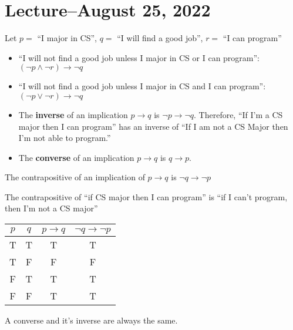 \documentclass{scrreprt}
\begin{document}
\section{Lecture--August 25, 2022}

Let $p=$ ``I major in CS'', $q=$ ``I will find a good job'', $r=$ ``I can program''

\begin{itemize}

	\item ``I will not find a good job unless I major in CS or I can program'': $(\neg p \land \neg r)\rightarrow \neg q$

	\item ``I will not find a good job unless I major in CS and I can program'': $(\neg p \lor \neg r)\rightarrow \neg q$

	\item The \textbf{inverse} of an implication $p\rightarrow q$ is $\neg p\rightarrow \neg q$.
	      Therefore, ``If I'm a CS major then I can program'' has an inverse of
	      ``If I am not a CS Major then I'm not able to program.''

	\item The \textbf{converse} of an implication $p\rightarrow q$ is $q\rightarrow p$.

\end{itemize}

\begin{definition}[Contrapositive]
	The contrapositive of an implication of $p\rightarrow q$ is $\neg q\rightarrow \neg p$

	The contrapositive of ``if CS major then I can program'' is ``if I can't program, then I'm not a CS major''

	\begin{tabular}{|c|c|c|c|}
		\hline
		$p$ & $q$ & $p\rightarrow q$ & $\neg q\rightarrow \neg p$ \\
		\hline
		T   & T   & T                & T                          \\
		T   & F   & F                & F                          \\
		F   & T   & T                & T                          \\
		F   & F   & T                & T                          \\
		\hline
	\end{tabular}

	A converse and it's inverse are always the same.

\end{definition}
\end{document}
